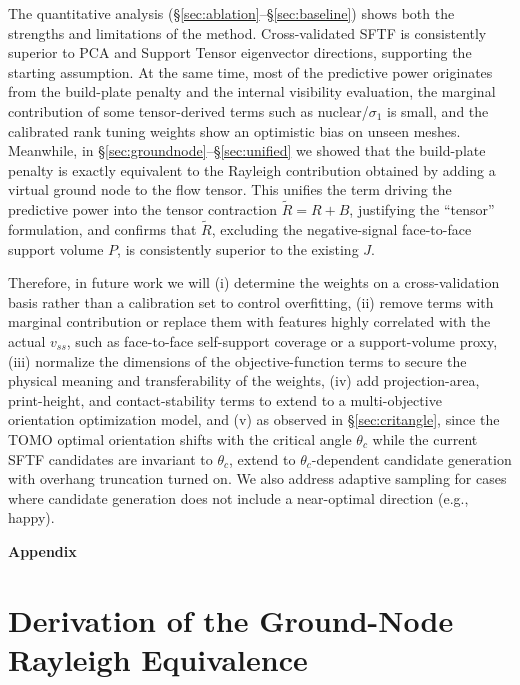 \documentclass[11pt,a4paper]{article}
\begin{document}
The quantitative analysis (\S\ref{sec:ablation}--\S\ref{sec:baseline}) shows both the strengths and limitations of the method.
Cross-validated SFTF is consistently superior to PCA and Support Tensor eigenvector directions, supporting the starting assumption.
At the same time, most of the predictive power originates from the build-plate penalty and the internal visibility evaluation,
the marginal contribution of some tensor-derived terms such as nuclear/$\sigma_1$ is small, and
the calibrated rank tuning weights show an optimistic bias on unseen meshes.
Meanwhile, in \S\ref{sec:groundnode}--\S\ref{sec:unified} we showed that the build-plate penalty is exactly equivalent
to the Rayleigh contribution obtained by adding a virtual ground node to the flow tensor.
This unifies the term driving the predictive power into the tensor contraction $\tilde R=R+B$, justifying the ``tensor'' formulation,
and confirms that $\tilde R$, excluding the negative-signal face-to-face support volume $P$, is consistently superior to the existing $J$.

Therefore, in future work we will (i) determine the weights on a cross-validation basis rather than a calibration set to control overfitting,
(ii) remove terms with marginal contribution or replace them with features highly correlated with the actual $v_{ss}$,
such as face-to-face self-support coverage or a support-volume proxy,
(iii) normalize the dimensions of the objective-function terms to secure the physical meaning and transferability of the weights,
(iv) add projection-area, print-height, and contact-stability terms to extend to a multi-objective orientation optimization model, and
(v) as observed in \S\ref{sec:critangle}, since the TOMO optimal orientation shifts with the critical angle $\theta_c$ while
the current SFTF candidates are invariant to $\theta_c$, extend to $\theta_c$-dependent candidate generation with overhang truncation turned on.
We also address adaptive sampling for cases where candidate generation does not include a near-optimal direction (e.g., happy).

\appendix

\clearpage
\begin{center}
{\LARGE\bfseries Appendix}
\end{center}
\vspace{1em}

\section{Derivation of the Ground-Node Rayleigh Equivalence}
\label{sec:appendix-proof}
\end{document}
